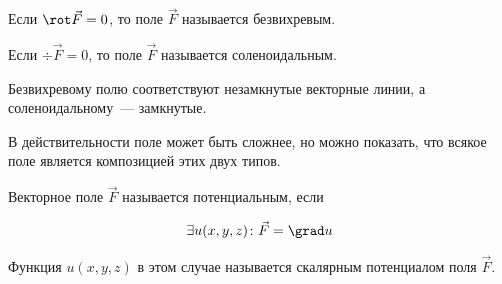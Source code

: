 
\begin{definition}
  Если \(\rot \vec{F} = 0\), то поле \(\vec{F}\) называется безвихревым.
\end{definition}

\begin{definition}
  Если \(\div \vec{F} = 0\), то поле \(\vec{F}\) называется соленоидальным.
\end{definition}

\begin{twocolumns}
  
  \columnbreak

  \begin{remark}
    Безвихревому полю соответствуют незамкнутые векторные линии, а
    соленоидальному~--- замкнутые.
  \end{remark}
\end{twocolumns}

\begin{remark}
  В действительности поле может быть сложнее, но можно показать, что всякое поле
  является композицией этих двух типов.
\end{remark}

\begin{definition}
  Векторное поле \(\vec{F}\) называется потенциальным, если

  \begin{align*}
    \exists u(x, y, z) \colon \vec{F} = \grad u
  \end{align*}

  Функция \(u(x, y, z)\) в этом случае называется скалярным потенциалом поля
  \(\vec{F}\).
\end{definition}

